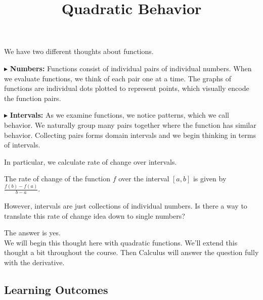 \documentclass{ximera}
\title{Quadratic Behavior}
\begin{document}
\begin{abstract}
\end{abstract}
\maketitle







We have two different thoughts about functions.


$\blacktriangleright$ \textbf{Numbers:}  Functions consist of individual pairs of individual numbers.  When we evaluate functions, we think of each pair one at a time.  The graphs of functions are individual dots plotted to represent points, which visually encode the function pairs. 







$\blacktriangleright$ \textbf{Intervals:} As we examine functions, we notice patterns, which we call behavior. We naturally group many pairs together where the function has similar behavior.  Collecting pairs forms domain intervals and we begin thinking in terms of intervals.





In particular, we calculate rate of change over intervals. 



The rate of change of the function $f$ over the interval $[a, b]$ is given by $\frac{f(b) - f(a)}{b - a}$.




However, intervals are just collections of individual numbers.  Is there a way to translate this rate of change idea down to single numbers?

The answer is yes.  \\


We will begin this thought here with quadratic functions. We'll extend this thought a bit throughout the course. Then Calculus will answer the question fully with the derivative.













\subsection{Learning Outcomes}
\end{document}
